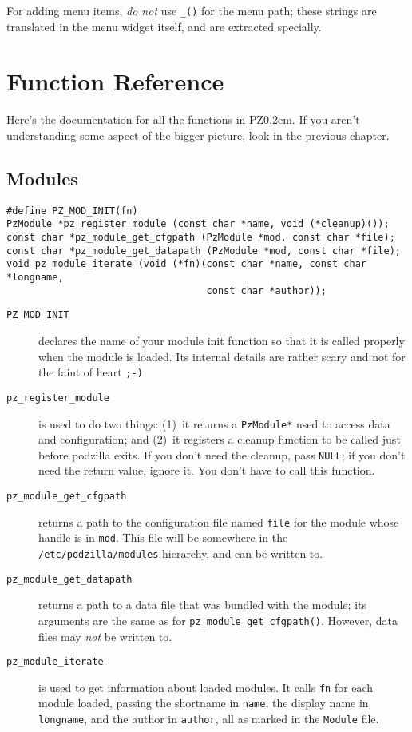\documentclass[12pt,letterpaper]{report}
\def\pz{{\footnotesize PZ}}
\def\pzt{\pz\kern0.2em{\large\oldstyle2}}
\let\ttt\tt
\def\tt{\def\_{{\ttt\char`\_}}\ttt}
\begin{document}
For adding menu items, {\it do not} use \verb|_()| for the menu path; these strings are
translated in the menu widget itself, and are extracted specially.

\chapter{Function Reference}
Here's the documentation for all the functions in \pzt. If you aren't understanding
some aspect of the bigger picture, look in the previous chapter.

\section{Modules}
\begin{verbatim}
#define PZ_MOD_INIT(fn)
PzModule *pz_register_module (const char *name, void (*cleanup)());
const char *pz_module_get_cfgpath (PzModule *mod, const char *file);
const char *pz_module_get_datapath (PzModule *mod, const char *file);
void pz_module_iterate (void (*fn)(const char *name, const char *longname,
                                   const char *author));
\end{verbatim}
\begin{description}
\item[{\tt PZ_MOD_INIT}] declares the name of your module init function so that it is called
properly when the module is loaded. Its internal details are rather scary and
not for the faint of heart {\tt ;-)}
\item[{\tt pz_register_module}] is used to do two things: (1)~it returns a
\verb|PzModule*| used to access data and configuration; and (2)~it registers
a cleanup function to be called just before podzilla exits. If you don't need
the cleanup, pass \verb|NULL|; if you don't need the return value, ignore it.
You don't have to call this function.
\item[{\tt pz_module_get_cfgpath}] returns a path to the configuration file named
\verb|file| for the module whose handle is in \verb|mod|. This file will be somewhere
in the \verb|/etc/podzilla/modules| hierarchy, and can be written to.
\item[{\tt pz_module_get_datapath}] returns a path to a data file that was bundled
with the module; its arguments are the same as for \verb|pz_module_get_cfgpath()|.
However, data files may {\it not} be written to.
\item[{\tt pz_module_iterate}] is used to get information about loaded modules. It
calls \verb|fn| for each module loaded, passing the shortname in \verb|name|, the
display name in \verb|longname|, and the author in \verb|author|, all as marked in
the \verb|Module| file.
\end{description}
\end{document}
